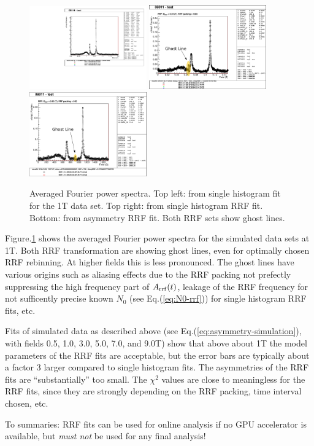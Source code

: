 \documentclass[twoside]{article}
\begin{document}
\begin{figure}[h]
 \centering
 \includegraphics[width=0.45\textwidth]{08011-Fourier-Averaged.pdf} \quad
 \includegraphics[width=0.45\textwidth]{08011-RRF-Histo-Fourier-Averaged-Ghost.pdf} \\
 \includegraphics[width=0.45\textwidth]{08011-RRF-Asym-Fourier-Averaged-Ghost.pdf}
 \caption{Averaged Fourier power spectra. Top left: from single histogram fit for the 1T data set. 
          Top right: from single histogram RRF fit. Bottom: from asymmetry RRF fit. Both RRF
          sets show ghost lines.}\label{fig:08011-Fourier}
\end{figure}

Figure.\ref{fig:08011-Fourier} shows the averaged Fourier power spectra for the simulated data sets at 1T. Both RRF transformation are
showing ghost lines, even for optimally chosen RRF rebinning. At higher fields this is less pronounced. The ghost lines have various origins 
such as aliasing effects due to the RRF packing not prefectly suppressing the high frequency part of $A_{\rm rrf}(t)$, leakage of the RRF frequency 
for not sufficently precise known $N_0$ (see Eq.(\ref{eq:N0-rrf})) for single histogram RRF fits, etc.

Fits of simulated data as described above (see Eq.(\ref{eq:asymmetry-simulation}), with fields 0.5, 1.0, 3.0, 5.0, 7.0, and 9.0T) show that above 
about 1T the model parameters of the RRF fits are acceptable, but the error bars are typically about a factor 3 larger compared to single histogram
fits. The asymmetries of the RRF fits are ``substantially'' too small. The $\chi^2$ values are close to meaningless for the RRF fits, since they
are strongly depending on the RRF packing, time interval chosen, etc. 

To summaries: RRF fits can be used for online analysis if no GPU accelerator is available, but \emph{must not} be used for any final analysis!



\end{document}
